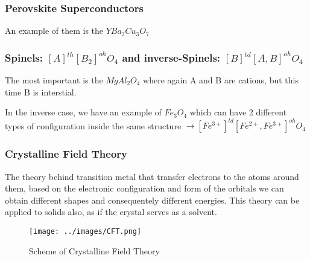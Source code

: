 \subsubsection{Perovskite Superconductors}

An example of them is the $YBa_2Cu_3O_7$

\subsubsection{Spinels: $[A]^{th}[B_2]^{oh}O_4$ and inverse-Spinels: $[B]^{td} [A,B]^{oh} O_4$ }

The most important is the $MgAl_2O_4$ where again A and B are cations, but this time B is interstial.

In the inverse case, we have an example of $Fe_3O_4$ which can have 2 different types of configuration inside the same structure $\rightarrow [Fe^{3+}]^{td}[Fe^{2+}, Fe^{3+}]^{oh}O_4$

\subsubsection{Crystalline Field Theory}

The theory behind transition metal that transfer electrons to the atoms around them, based on the electronic configuration and form of the orbitals we can obtain different shapes and consequentely different energies. This theory can be applied to solids also, as if the crystal serves as a solvent.

\begin{figure}[ht]
    \centering
    \texttt{[image: ../images/CFT.png]}
    \caption{Scheme of Crystalline Field Theory}
    \label{fig:CFT}
\end{figure}
